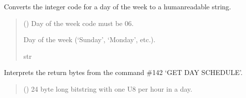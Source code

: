 \documentclass[letterpaper,10pt,english]{sphinxmanual}
\begin{document}
\begin{fulllineitems}
\begin{fulllineitems}
\label{\detokenize{Morelia.Devices:Morelia.Devices.PodDevice_8229.Pod8229.DecodeDayOfWeek}}
\pysigstartsignatures
{}
\pysigstopsignatures
\sphinxAtStartPar
Converts the integer code for a day of the week to a human\sphinxhyphen{}readable string.
\begin{quote}\begin{description}
\sphinxAtStartPar
{} () \textendash{} Day of the week code must be 0\sphinxhyphen{}6.

\sphinxAtStartPar
Day of the week (‘Sunday’, ‘Monday’, etc.).

\sphinxAtStartPar
str

\end{description}\end{quote}

\end{fulllineitems}


\begin{fulllineitems}
\label{\detokenize{Morelia.Devices:Morelia.Devices.PodDevice_8229.Pod8229.DecodeDaySchedule}}
\pysigstartsignatures
{}
\pysigstopsignatures
\sphinxAtStartPar
Interprets the return bytes from the command \#142 ‘GET DAY SCHEDULE’.
\begin{quote}\begin{description}
\sphinxAtStartPar
{} () \textendash{} 24 byte long bitstring with one U8 per hour in a day.


\end{description}
\end{quote}
\end{fulllineitems}
\end{fulllineitems}
\end{document}
